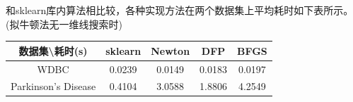 \documentclass{SCIS2020cn}
\begin{document}
和sklearn库内算法相比较，各种实现方法在两个数据集上平均耗时如下表所示。(拟牛顿法无一维线搜索时)
\begin{table}[]
    \label{tb3}
    \begin{center}
        \begin{tabular}{@{}ccccc@{}}
            \toprule
            数据集\textbackslash{}耗时(s) & sklearn & Newton & DFP    & BFGS   \\ \hline
WDBC                     & 0.0239  & 0.0149 & 0.0183 & 0.0197 \\
Parkinson's Disease      & 0.4104  & 3.0588 & 1.8806 & 4.2549 \\ \hline
            \end{tabular}
    \end{center}
\end{table}
\end{document}
